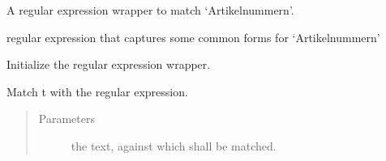 \documentclass[letterpaper,10pt,english]{sphinxmanual}
\begin{document}
\begin{fulllineitems}
\label{\detokenize{api:anr_matcher.ANRMatcher}}
A regular expression wrapper to match ‘Artikelnummern’.

\begin{fulllineitems}
\label{\detokenize{api:anr_matcher.ANRMatcher.complete_re}}
regular expression that captures some common forms
for ‘Artikelnummern’

\end{fulllineitems}


\begin{fulllineitems}
\label{\detokenize{api:anr_matcher.ANRMatcher.__init__}}
Initialize the regular expression wrapper.

\end{fulllineitems}


\begin{fulllineitems}
\label{\detokenize{api:anr_matcher.ANRMatcher.match}}
Match t with the regular expression.
\begin{quote}\begin{description}
\item[{Parameters}] \leavevmode
{} \textendash{} the text, against which  shall be
matched.

\end{description}\end{quote}

\end{fulllineitems}


\end{fulllineitems}

\label{\detokenize{api:module-product_crf}}
\end{document}
